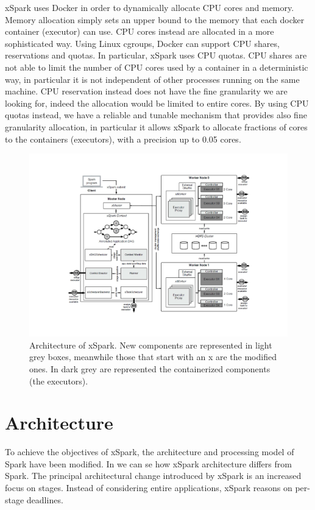 xSpark uses Docker in order to dynamically allocate CPU cores and memory. Memory allocation simply sets an upper bound to the memory that each docker container (executor) can use. CPU cores instead are allocated in a more sophisticated way.
Using Linux cgroups, Docker can support CPU shares, reservations and quotas. In particular, xSpark uses CPU quotas. CPU shares are not able to limit the number of CPU cores used by a container in a deterministic way, in particular it is not independent of other processes
running on the same machine. CPU reservation instead does not have the fine granularity we are looking for, indeed the allocation would be limited to entire cores. By using CPU quotas instead, we have a reliable and tunable mechanism that provides also fine granularity
allocation, in particular it allows xSpark to allocate fractions of cores
to the containers (executors), with a precision up to 0.05 cores.
\begin{figure}
	\centering
	\includegraphics[width=\columnwidth]{Images/xspark_architecture.pdf}  
	\caption[Architecture of xSpark.]{Architecture of xSpark. New components are represented in light grey boxes, meanwhile those that start with an x are the modified ones. In dark grey are represented the containerized components (the executors).}
	\label{fig:xSparkArchitecture}
\end{figure}
\section{Architecture}\label{sec:architecture}

To achieve the objectives of xSpark, the architecture and processing model of Spark have been modified. In  we can se how xSpark architecture differs from Spark. The principal architectural change introduced by xSpark is an increased focus on stages. Instead of considering entire applications, xSpark reasons on per-stage deadlines. 

